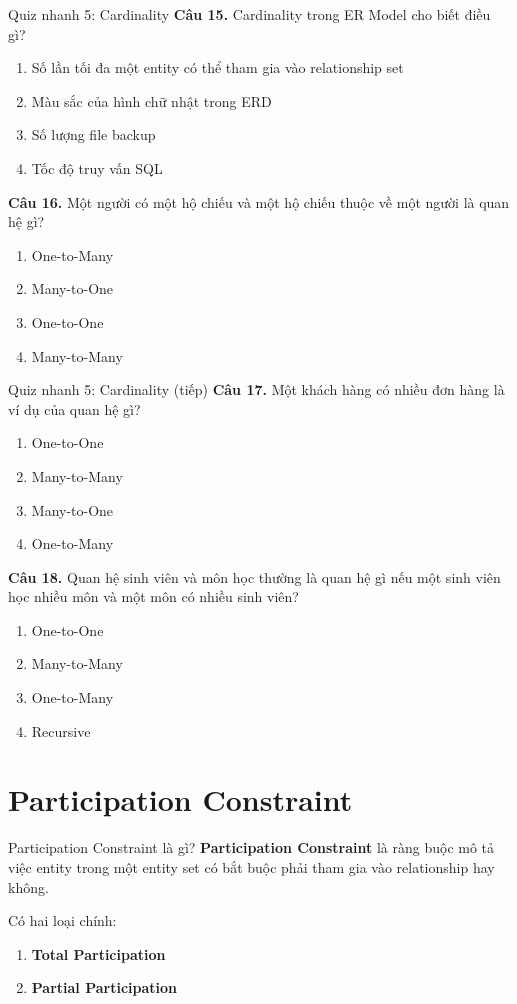 \documentclass[aspectratio=169,11pt]{beamer}
\newcommand{\keyword}[1]{\textcolor{accent}{\textbf{#1}}}
\newcommand{\kw}[1]{\keyword{#1}}
\newcommand{\tightlist}{\setlength{\itemsep}{2pt}\setlength{\parskip}{0pt}}
\newcommand{\smallitem}{\setlength{\itemsep}{2pt}\setlength{\parskip}{0pt}}
\newcommand{\qoption}[2]{\item[#1.] #2}
\begin{document}
\begin{frame}{Quiz nhanh 5: Cardinality}
\small
\textbf{Câu 15.} Cardinality trong ER Model cho biết điều gì?
\begin{enumerate}
\tightlist
  \qoption{A}{Số lần tối đa một entity có thể tham gia vào relationship set}
  \qoption{B}{Màu sắc của hình chữ nhật trong ERD}
  \qoption{C}{Số lượng file backup}
  \qoption{D}{Tốc độ truy vấn SQL}
\end{enumerate}

\textbf{Câu 16.} Một người có một hộ chiếu và một hộ chiếu thuộc về một người là quan hệ gì?
\begin{enumerate}
\tightlist
  \qoption{A}{One-to-Many}
  \qoption{B}{Many-to-One}
  \qoption{C}{One-to-One}
  \qoption{D}{Many-to-Many}
\end{enumerate}
\end{frame}

\begin{frame}{Quiz nhanh 5: Cardinality (tiếp)}
\small
\textbf{Câu 17.} Một khách hàng có nhiều đơn hàng là ví dụ của quan hệ gì?
\begin{enumerate}
\tightlist
  \qoption{A}{One-to-One}
  \qoption{B}{Many-to-Many}
  \qoption{C}{Many-to-One}
  \qoption{D}{One-to-Many}
\end{enumerate}

\textbf{Câu 18.} Quan hệ sinh viên và môn học thường là quan hệ gì nếu một sinh viên học nhiều môn và một môn có nhiều sinh viên?
\begin{enumerate}
\tightlist
  \qoption{A}{One-to-One}
  \qoption{B}{Many-to-Many}
  \qoption{C}{One-to-Many}
  \qoption{D}{Recursive}
\end{enumerate}
\end{frame}

\section{Participation Constraint}

\begin{frame}{Participation Constraint là gì?}
\small
\kw{Participation Constraint} là ràng buộc mô tả việc entity trong một entity set có bắt buộc phải tham gia vào relationship hay không.

\vspace{2mm}
Có hai loại chính:
\begin{enumerate}
\smallitem
  \item \kw{Total Participation}
  \item \kw{Partial Participation}
\end{enumerate}
\end{frame}
\end{document}
